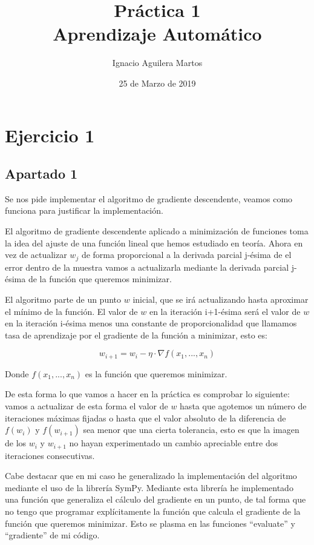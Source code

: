 \documentclass[12pt,a4paper]{article}
\author{Ignacio Aguilera Martos}
\title{Práctica 1 \\ Aprendizaje Automático}
\date{25 de Marzo de 2019}
\begin{document}
	\maketitle

	\tableofcontents

	\newpage

\section{Ejercicio 1}

\subsection{Apartado 1}

Se nos pide implementar el algoritmo de gradiente descendente, veamos como funciona para justificar la implementación.

El algoritmo de gradiente descendente aplicado a minimización de funciones toma la idea del ajuste de una función lineal que hemos estudiado en teoría. Ahora en vez de actualizar $w_j$ de forma proporcional a la derivada parcial j-ésima de el error dentro de la muestra vamos a actualizarla mediante la derivada parcial j-ésima de la función que queremos minimizar.

El algoritmo parte de un punto $w$ inicial, que se irá actualizando hasta aproximar el mínimo de la función. El valor de $w$ en la iteración i+1-ésima será el valor de $w$ en la iteración i-ésima menos una constante de proporcionalidad que llamamos tasa de aprendizaje por el gradiente de la función a minimizar, esto es:

$$w_{i+1} = w_i - \eta \cdot \nabla f(x_1,...,x_n)$$

Donde $f(x_1,...,x_n)$ es la función que queremos minimizar.

De esta forma lo que vamos a hacer en la práctica es comprobar lo siguiente: vamos a actualizar de esta forma el valor de $w$ hasta que agotemos un número de iteraciones máximas fijadas o hasta que el valor absoluto de la diferencia de $f(w_i)$ y $f(w_{i+1})$ sea menor que una cierta tolerancia, esto es que la imagen de los $w_i$ y $w_{i+1}$ no hayan experimentado un cambio apreciable entre dos iteraciones consecutivas.

Cabe destacar que en mi caso he generalizado la implementación del algoritmo mediante el uso de la librería SymPy. Mediante esta librería he implementado una función que generaliza el cálculo del gradiente en un punto, de tal forma que no tengo que programar explícitamente la función que calcula el gradiente de la función que queremos minimizar. Esto se plasma en las funciones ``evaluate'' y ``gradiente'' de mi código.
\end{document}
